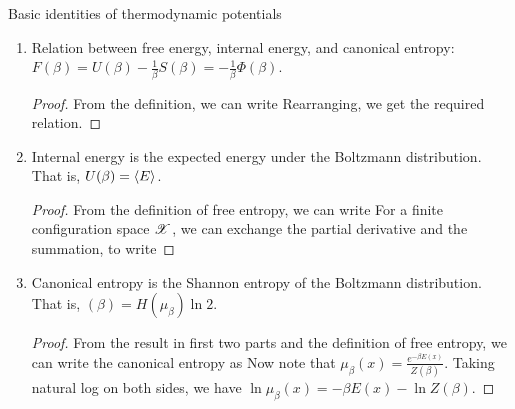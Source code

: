 \documentclass[letterpaper,english,10pt]{article}
\begin{document}
\begin{lem} Basic identities of thermodynamic potentials
\begin{enumerate}
\item Relation between free energy, internal energy, and canonical entropy: $F(\beta)=U(\beta)-\frac{1}{\beta}S(\beta)=-\frac{1}{\beta} \Phi(\beta)$.
\begin{proof}
From the definition, we can write 
Rearranging, we get the required relation.
\end{proof}
\item Internal energy is the expected energy under the Boltzmann distribution. That is, $U(\beta)=\left\langle E\right\rangle$.  
\begin{proof}
From the definition of free entropy, we can write 
For a finite configuration space $\mathscr{X}$, we can exchange the partial derivative and the summation, to write
\end{proof}
\item Canonical entropy is the Shannon entropy of the Boltzmann distribution. That is, $(\beta)= {H(\mu_\beta)}{\ln 2}.$
\begin{proof}
From the result in first two parts and the definition of free entropy, we can write the canonical entropy as 
Now note that $\mu_{\beta}(x)=\frac{e^{-\beta E(x)}}{Z(\beta)}$. 
Taking natural log on both sides, we have $\ln \mu_\beta(x)= -\beta E(x)-\ln Z(\beta)$. 

\end{proof}
\end{enumerate}
\end{lem}
\end{document}
